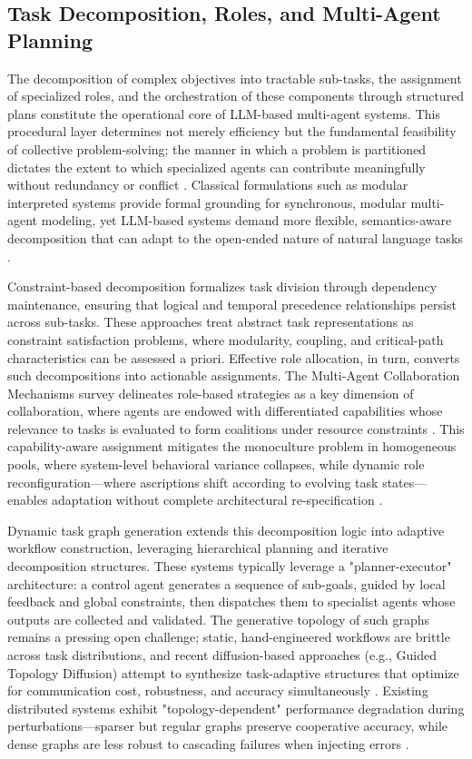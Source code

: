 \documentclass[11pt,a4paper]{article}
\begin{document}
\subsection{Task Decomposition, Roles, and Multi-Agent Planning}


The decomposition of complex objectives into tractable sub-tasks, the assignment of specialized roles, and the orchestration of these components through structured plans constitute the operational core of LLM-based multi-agent systems. This procedural layer determines not merely efficiency but the fundamental feasibility of collective problem-solving; the manner in which a problem is partitioned dictates the extent to which specialized agents can contribute meaningfully without redundancy or conflict \cite{arxiv:2506.05364v2,arxiv:2504.16736v3}. Classical formulations such as modular interpreted systems provide formal grounding for synchronous, modular multi-agent modeling, yet LLM-based systems demand more flexible, semantics-aware decomposition that can adapt to the open-ended nature of natural language tasks \cite{arxiv:1307.4477v1}.

Constraint-based decomposition formalizes task division through dependency maintenance, ensuring that logical and temporal precedence relationships persist across sub-tasks. These approaches treat abstract task representations as constraint satisfaction problems, where modularity, coupling, and critical-path characteristics can be assessed a priori. Effective role allocation, in turn, converts such decompositions into actionable assignments. The Multi-Agent Collaboration Mechanisms survey delineates role-based strategies as a key dimension of collaboration, where agents are endowed with differentiated capabilities whose relevance to tasks is evaluated to form coalitions under resource constraints \cite{arxiv:2501.06322v1}. This capability-aware assignment mitigates the monoculture problem in homogeneous pools, where system-level behavioral variance collapses, while dynamic role reconfiguration---where ascriptions shift according to evolving task states---enables adaptation without complete architectural re-specification \cite{arxiv:2502.04506v1}.

Dynamic task graph generation extends this decomposition logic into adaptive workflow construction, leveraging hierarchical planning and iterative decomposition structures. These systems typically leverage a "planner-executor" architecture: a control agent generates a sequence of sub-goals, guided by local feedback and global constraints, then dispatches them to specialist agents whose outputs are collected and validated. The generative topology of such graphs remains a pressing open challenge; static, hand-engineered workflows are brittle across task distributions, and recent diffusion-based approaches (e.g., Guided Topology Diffusion) attempt to synthesize task-adaptive structures that optimize for communication cost, robustness, and accuracy simultaneously \cite{arxiv:2510.07799v2}. Existing distributed systems exhibit "topology-dependent" performance degradation during perturbations---sparser but regular graphs preserve cooperative accuracy, while dense graphs are less robust to cascading failures when injecting errors \cite{arxiv:2505.23352v1}.
\end{document}
